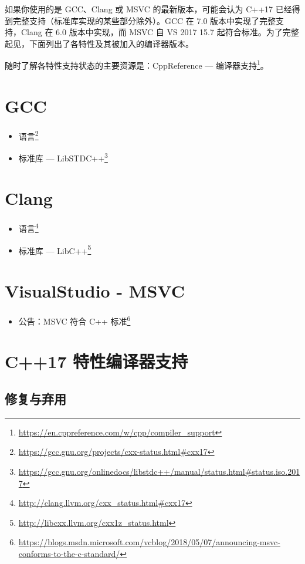 如果你使用的是 GCC、Clang 或 MSVC 的最新版本，可能会认为 C++17 已经得到完整支持（标准库实现的某些部分除外）。GCC 在 7.0 版本中实现了完整支持，Clang 在 6.0 版本中实现，而 MSVC 自 VS 2017 15.7 起符合标准。为了完整起见，下面列出了各特性及其被加入的编译器版本。

随时了解各特性支持状态的主要资源是：CppReference — 编译器支持\footnote{\url{https://en.cppreference.com/w/cpp/compiler_support}}。

\section{GCC}

\begin{itemize}
\item 语言\footnote{\url{https://gcc.gnu.org/projects/cxx-status.html\#cxx17}}
\item 标准库 — LibSTDC++\footnote{\url{https://gcc.gnu.org/onlinedocs/libstdc++/manual/status.html\#status.iso.2017}}
\end{itemize}

\section{Clang}

\begin{itemize}
\item 语言\footnote{\url{http://clang.llvm.org/cxx_status.html\#cxx17}}
\item 标准库 — LibC++\footnote{\url{http://libcxx.llvm.org/cxx1z_status.html}}
\end{itemize}

\section{VisualStudio - MSVC}

\begin{itemize}
\item 公告：MSVC 符合 C++ 标准\footnote{\url{https://blogs.msdn.microsoft.com/vcblog/2018/05/07/announcing-msvc-conforms-to-the-c-standard/}}
\end{itemize}

\section{C++17 特性编译器支持}

\subsection{修复与弃用}

